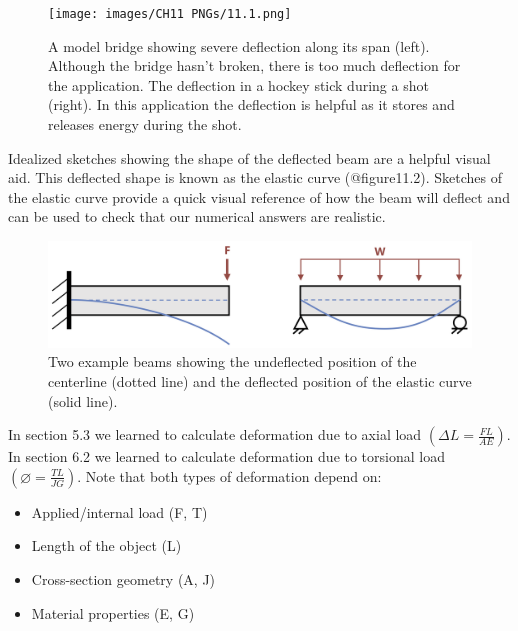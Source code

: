\documentclass[
  letterpaper,
  DIV=11,
  numbers=noendperiod]{scrreprt}
\begin{document}
\begin{figure}

{\centering \texttt{[image: images/CH11 PNGs/11.1.png]}

}

\caption{A model bridge showing severe deflection along its span (left).
Although the bridge hasn't broken, there is too much deflection for the
application. The deflection in a hockey stick during a shot (right). In
this application the deflection is helpful as it stores and releases
energy during the shot.}

\end{figure}%

Idealized sketches showing the shape of the deflected beam are a helpful
visual aid. This deflected shape is known as the elastic curve
(@figure11.2). Sketches of the elastic curve provide a quick visual
reference of how the beam will deflect and can be used to check that our
numerical answers are realistic.

\begin{figure}

{\centering \includegraphics{images/CH11 PNGs/11.2.png}

}

\caption{Two example beams showing the undeflected position of the
centerline (dotted line) and the deflected position of the elastic curve
(solid line).}

\end{figure}%

In section 5.3 we learned to calculate deformation due to axial load
\(\left(\Delta L=\frac{F L}{A E}\right)\). In section 6.2 we learned to
calculate deformation due to torsional load
\(\left(\varnothing=\frac{T L}{J G}\right)\). Note that both types of
deformation depend on:

\begin{itemize}
\item
  Applied/internal load (F, T)
\item
  Length of the object (L)
\item
  Cross-section geometry (A, J)
\item
  Material properties (E, G)
\end{itemize}
\end{document}
